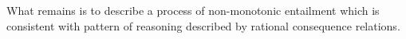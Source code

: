 What remains is to describe a process of non-monotonic entailment which is consistent with pattern of reasoning described by rational consequence relations.







